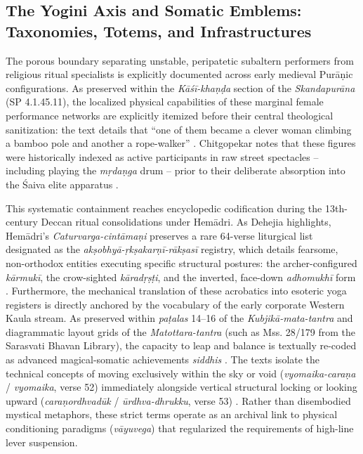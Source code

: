 \documentclass[11pt,twoside,letterpaper]{article}
\begin{document}
\subsection{The Yogini Axis and Somatic Emblems: Taxonomies, Totems, and Infrastructures}

The porous boundary separating unstable, peripatetic subaltern performers from religious ritual specialists is explicitly documented across early medieval Purāṇic configurations. As preserved within the \textit{Kāśī-khaṇḍa} section of the \textit{Skandapurāna} (SP 4.1.45.11), the localized physical capabilities of these marginal female performance networks are explicitly itemized before their central theological sanitization: the text details that “one of them became a clever woman climbing a bamboo pole and another a rope-walker” \citep{Shastri1991}. Chitgopekar notes that these figures were historically indexed as active participants in raw street spectacles -- including playing the \textit{ mṛdaṇga} drum -- prior to their deliberate absorption into the Śaiva elite apparatus \citep{Chitgopekar2002}.

This systematic containment reaches encyclopedic codification during the 13th-century Deccan ritual consolidations under Hemādri. As Dehejia highlights, Hemādri’s \textit{Caturvarga-cintāmaṇi} preserves a rare 64-verse liturgical list designated as the \textit{akṣobhyā-ṛkṣakarṇī-rākṣasī} registry, which details fearsome, non-orthodox entities executing specific structural postures: the archer-configured \textit{kārmukī}, the crow-sighted \textit{kāradṛṣṭi}, and the inverted, face-down \textit{adhomukhī} form \citep{Dehejia1986}. Furthermore, the mechanical translation of these acrobatics into esoteric yoga registers is directly anchored by the vocabulary of the early corporate Western Kaula stream. As preserved within \textit{paṭalas} 14–16 of the \textit{Kubjikā-mata-tantra} and diagrammatic layout grids of the \textit{ Matottara-tantra} (such as Mss. 28/179 from the Sarasvati Bhavan Library), the capacity to leap and balance is textually re-coded as advanced magical-somatic achievements \textit{siddhis} \citep{Dehejia1986}. The texts isolate the technical concepts of moving exclusively within the sky or void (\textit{vyomaika-caraṇa} / \textit{vyomaika}, verse 52) immediately alongside vertical structural locking or looking upward (\textit{caraṇordhvadūk} / \textit{ūrdhva-dhrukku}, verse 53) \citep{Dehejia1986, Mallinson2007}. Rather than disembodied mystical metaphors, these strict terms operate as an archival link to physical conditioning paradigms (\textit{vāyuvega}) that regularized the requirements of high-line lever suspension.
\end{document}
